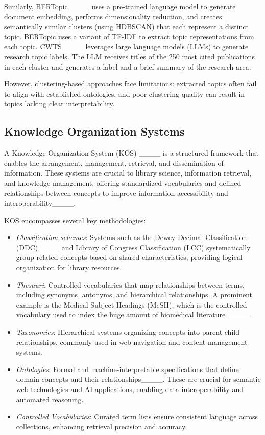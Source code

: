 Similarly, BERTopic____ uses a pre-trained language model to generate document embedding, performs dimensionality reduction, and creates semantically similar clusters (using HDBSCAN) that each represent a distinct topic. BERTopic uses a variant of TF-IDF to extract topic representations from each topic. 
CWTS____ leverages large language models (LLMs) to generate research topic labels. The LLM receives titles of the 250 most cited publications in each cluster and generates a label and a brief summary of the research area. 

However, clustering-based approaches face limitations: extracted topics often fail to align with established ontologies, and poor clustering quality can result in topics lacking clear interpretability.

\subsection{Knowledge Organization Systems} 

A Knowledge Organization System (KOS) ____ is a structured framework that enables the arrangement, management, retrieval, and dissemination of information. 
These systems are crucial to library science, information retrieval, and knowledge management, offering standardized vocabularies and defined relationships between concepts to improve information accessibility and interoperability____. 

KOS encompasses several key methodologies:
\begin{itemize}[leftmargin=*]
    \item \emph{Classification schemes}: Systems such as the Dewey Decimal Classification (DDC)____ and Library of Congress Classification (LCC) systematically group related concepts based on shared characteristics, providing logical organization for library resources.
    \item \emph{Thesauri}: Controlled vocabularies that map relationships between terms, including synonyms, antonyms, and hierarchical relationships. A prominent example is the Medical Subject Headings (MeSH), which is the controlled vocabulary used to index the huge amount of biomedical literature ____.
    \item \emph{Taxonomies}: Hierarchical systems organizing concepts into parent-child relationships, commonly used in web navigation and content management systems.
    \item \emph{Ontologies}: Formal and machine-interpretable specifications that define domain concepts and their relationships____. These are crucial for semantic web technologies and AI applications, enabling data interoperability and automated reasoning.
    \item \emph{Controlled Vocabularies}: Curated term lists ensure consistent language across collections, enhancing retrieval precision and accuracy.
\end{itemize}

